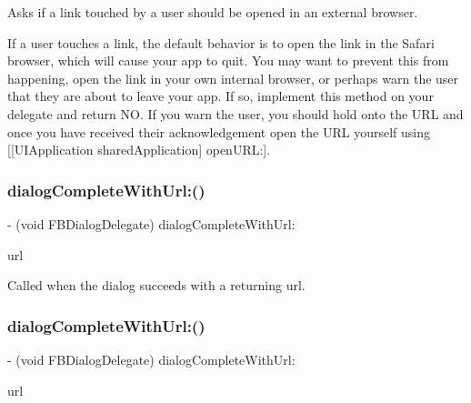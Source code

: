 Asks if a link touched by a user should be opened in an external browser.

If a user touches a link, the default behavior is to open the link in the Safari browser, which will cause your app to quit. You may want to prevent this from happening, open the link in your own internal browser, or perhaps warn the user that they are about to leave your app. If so, implement this method on your delegate and return NO. If you warn the user, you should hold onto the U\+RL and once you have received their acknowledgement open the U\+RL yourself using \mbox{[}\mbox{[}U\+I\+Application shared\+Application\mbox{]} open\+U\+RL\+:\mbox{]}. \mbox{\label{protocolFBDialogDelegate_01-p_acc841de7a1c7fd57e4447abd9ffbb3ee}} 
\subsubsection{\texorpdfstring{dialog\+Complete\+With\+Url\+:()}{dialogCompleteWithUrl:()}\hspace{0.1cm}{\footnotesize\ttfamily [1/2]}}
{\footnotesize\ttfamily -\/ (void F\+B\+Dialog\+Delegate) dialog\+Complete\+With\+Url\+: \begin{DoxyParamCaption}\item[{(N\+S\+U\+RL $\ast$)}]{url }\end{DoxyParamCaption}\hspace{0.3cm}{\ttfamily [optional]}}

Called when the dialog succeeds with a returning url. \mbox{\label{protocolFBDialogDelegate_01-p_acc841de7a1c7fd57e4447abd9ffbb3ee}} 
\subsubsection{\texorpdfstring{dialog\+Complete\+With\+Url\+:()}{dialogCompleteWithUrl:()}\hspace{0.1cm}{\footnotesize\ttfamily [2/2]}}
{\footnotesize\ttfamily -\/ (void F\+B\+Dialog\+Delegate) dialog\+Complete\+With\+Url\+: \begin{DoxyParamCaption}\item[{(N\+S\+U\+RL $\ast$)}]{url }\end{DoxyParamCaption}\hspace{0.3cm}{\ttfamily [optional]}}

